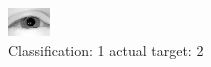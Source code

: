 \begin{figure}[h!]
\begin{center}
\includegraphics[width=0.60\columnwidth]{figures/ID2265_class_1_target_2.png}
\end{center}
\caption{ Classification: 1 actual target: 2}
\label{fig:ID2265_class_1_target_2}
\end{figure}
